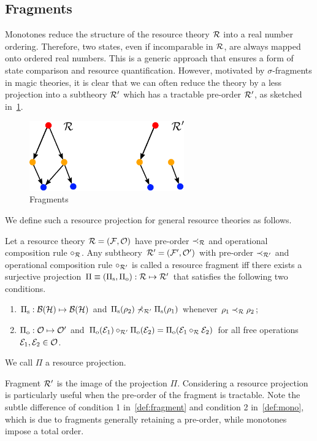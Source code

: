 \subsection{Fragments}

Monotones reduce the structure of the resource theory $\mathcal{R}$ into a real number ordering.
Therefore, two states, even if incomparable in $\mathcal{R}$, are always mapped onto ordered real numbers.
This is a generic approach that ensures a form of state comparison and resource quantification.
However, motivated by $\sigma$-fragments in magic theories, it is clear that we can often reduce the theory by a less  projection into a subtheory $\mathcal{R}'$ which has a tractable pre-order $\mathcal{R}'$, as sketched in~\cref{fig:fragments}.
\begin{figure}[t]
    \centering
    \includegraphics[height=3cm]{sections/major/fragments.pdf}
    \caption{Fragments 
    }
    \label{fig:fragments}
\end{figure}
We define such a resource projection for general resource theories as follows.
\begin{definition}\label{def:fragment}
    Let a resource theory $\mathcal{R} = (\mathcal{F}, \mathcal{O})$ have pre-order $\prec_{\mathcal{R}}$ and operational composition rule $\circ_{\mathcal{R}}$. 
    Any subtheory $\mathcal{R}' = (\mathcal{F}', \mathcal{O}')$ with pre-order $\prec_{\mathcal{R}'}$ and operational composition rule $\circ_{\mathcal{R}'}$ is called a resource fragment iff there exists a surjective projection $\Pi \equiv (\Pi_{\rm{s}}, \Pi_{\rm{o}}): \mathcal{R} \mapsto \mathcal{R}'$ that satisfies the following two conditions.
    \begin{enumerate}
        \item $\Pi_{\rm{s}}: \mathcal{B}(\mathcal{H}) \mapsto \mathcal{B}(\mathcal{H})$ and $\Pi_{\rm{s}}(\rho_2) \nprec_{\mathcal{R}'} \Pi_{\rm{s}}(\rho_1)$ whenever $\rho_1 \prec_{\mathcal{R}} \rho_2$;
        \item $\Pi_{\rm{o}}: \mathcal{O} \mapsto \mathcal{O}'$ and $\Pi_{\rm{o}}(\mathcal{E}_1) \circ_{\mathcal{R}'} \Pi_{\rm{o}}(\mathcal{E}_2) = \Pi_{\rm{o}}(\mathcal{E}_1 \circ_{\mathcal{R}} \mathcal{E}_2)$ for all free operations $\mathcal{E}_1, \mathcal{E}_2 \in \mathcal{O}$.
    \end{enumerate}
    We call $\Pi$ a resource projection.
\end{definition}
Fragment $\mathcal{R}'$ is the image of the projection $\Pi$.
Considering a resource projection is particularly useful when the pre-order of the fragment is tractable.
Note the subtle difference of condition 1 in~\cref{def:fragment} and condition 2 in~\cref{def:mono}, which is due to fragments generally retaining a pre-order, while monotones impose a total order.

